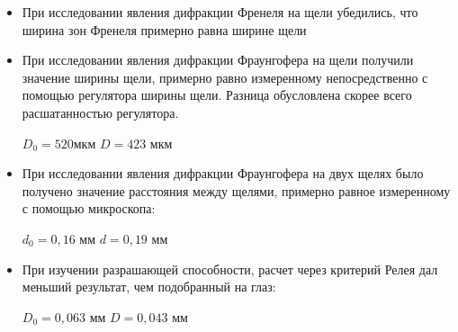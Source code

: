 \documentclass[a4paper,12pt]{article}
\begin{document}
\begin{itemize}
    \item При исследовании явления дифракции Френеля на щели убедились, что ширина зон Френеля примерно равна ширине щели
    
    \item При исследовании явления дифракции Фраунгофера на щели получили значение ширины щели, примерно равно измеренному непосредственно с помощью регулятора ширины щели. Разница обусловлена скорее всего расшатанностью регулятора.
    \begin{center}
        $D_0 = 520 $мкм \hspace{1cm} $D = 423$ мкм
    \end{center}
    
    \item При исследовании явления дифракции Фраунгофера на двух щелях было получено значение расстояния между щелями, примерно равное измеренному с помощью микроскопа:
    
    \begin{center}
        $d_0 = 0,16$ мм \hspace{1cm} $d= 0,19$ мм
    \end{center}
    \item При изучении разрашающей способности, расчет через критерий Релея дал меньший результат, чем подобранный на глаз:
    
    \begin{center}
        $D_0 = 0,063$ мм \hspace{1cm} $D= 0,043$ мм
    \end{center}
\end{itemize}
\end{document}
